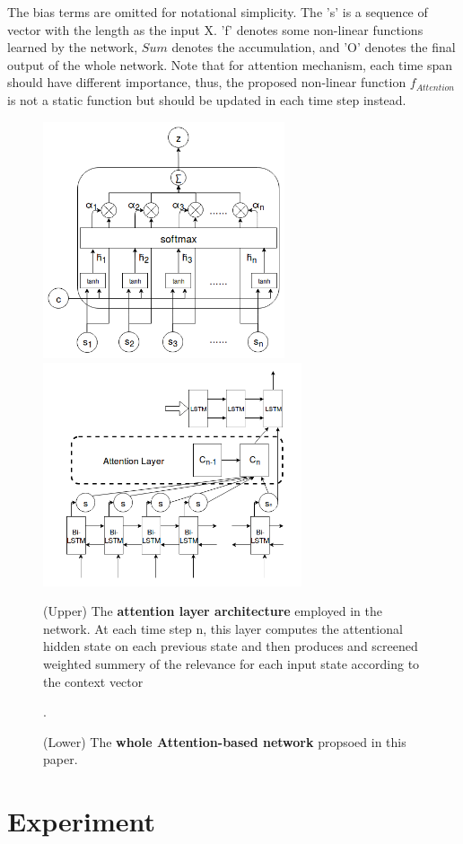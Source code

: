 \documentclass[journal]{IEEEtran}
\begin{document}
The bias terms are omitted for notational simplicity. The 's' is a sequence of vector with the length as the input X. 'f' denotes some non-linear functions learned by the network, $Sum$ denotes the accumulation, and 'O' denotes the final output of the whole network. Note that for attention mechanism, each time span should have different importance, thus, the proposed non-linear function $f_{Attention}$ is not a static function but should be updated in each time step instead.


\begin{figure}[!t]
\centering
\includegraphics[width=2.8in]{fig_01.png}
\includegraphics[width=3in]{fig_02.png}
\caption{(Upper) The \textbf{attention layer architecture} employed in the network. At each time step n, this layer computes the attentional hidden state on each previous state and then produces and screened weighted summery of the relevance for each input state according to the context vector}
\caption{(Lower) The \textbf{whole Attention-based network} propsoed in this paper.}. 
\end{figure}


\section{Experiment}
\end{document}
